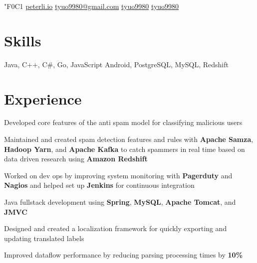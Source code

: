\documentclass[]{peter_resume}
\begin{document}

{

   {\fa\char"F0C1} \href{http://peterli.io}{peterli.io}
     \href{mailto:tyuo9980@gmail.com}{tyuo9980@gmail.com}
     \href{https://github.com/tyuo9980}{tyuo9980}
     \href{https://www.linkedin.com/in/tyuo9980}{tyuo9980} 
}
\sectionsep
\vspace{0.3cm}

\begin{minipage}{\textwidth}


\section{Skills}
{\hfill Java, C++, C\#, Go, JavaScript}
\vspace{0.1cm}
{\hfill Android, PostgreSQL, MySQL, Redshift}
\sectionsep


\section{Experience}
\vspace{\topsep} %
\begin{tightemize}
\item Developed core features of the anti spam model for classifying malicious users
\item Maintained and created spam detection features and rules with \textbf{Apache Samza}, \textbf{Hadoop Yarn}, and \textbf{Apache Kafka} to catch spammers in real time based on data driven research using \textbf{Amazon Redshift}
\item Worked on dev ops by improving system monitoring with \textbf{Pagerduty} and \textbf{Nagios} and helped set up \textbf{Jenkins} for continuous integration
\end{tightemize}
\sectionsep

\begin{tightemize}
\item Java fullstack development using \textbf{Spring}, \textbf{MySQL}, \textbf{Apache Tomcat}, and \textbf{JMVC}
\item Designed and created a localization framework for quickly exporting and updating translated labels
\item Improved dataflow performance by reducing parsing processing times by \textbf{10\%}
\end{tightemize}
\sectionsep


\end{minipage}
\end{document}
